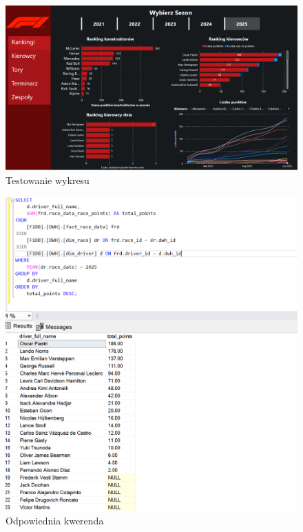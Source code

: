 \documentclass[12pt]{article}
\begin{document}
\begin{figure}[H]
    \centering   \includegraphics[width=\textwidth]{raport1.png}
    \caption{Testowanie wykresu}
\end{figure}

\begin{figure}[H]
    \centering   \includegraphics[width=\textwidth]{t1.png}
    \caption{Odpowiednia kwerenda}
\end{figure}
\end{document}

